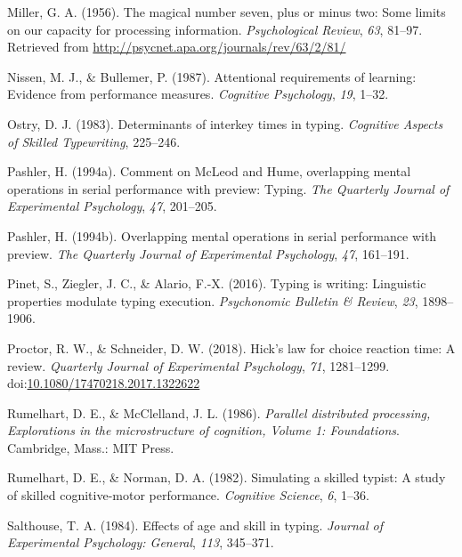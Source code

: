 \documentclass[,man,floatsintext]{apa6}
\begin{document}
\leavevmode\hypertarget{ref-miller_magical_1956}{}%
Miller, G. A. (1956). The magical number seven, plus or minus two: Some limits on our capacity for processing information. \emph{Psychological Review}, \emph{63}, 81--97. Retrieved from \url{http://psycnet.apa.org/journals/rev/63/2/81/}

\leavevmode\hypertarget{ref-NissenAttentionalrequirementslearning1987}{}%
Nissen, M. J., \& Bullemer, P. (1987). Attentional requirements of learning: Evidence from performance measures. \emph{Cognitive Psychology}, \emph{19}, 1--32.

\leavevmode\hypertarget{ref-OstryDeterminantsinterkeytimes1983}{}%
Ostry, D. J. (1983). Determinants of interkey times in typing. \emph{Cognitive Aspects of Skilled Typewriting}, 225--246.

\leavevmode\hypertarget{ref-pashler_comment_1994}{}%
Pashler, H. (1994a). Comment on McLeod and Hume, overlapping mental operations in serial performance with preview: Typing. \emph{The Quarterly Journal of Experimental Psychology}, \emph{47}, 201--205.

\leavevmode\hypertarget{ref-pashler_overlapping_1994}{}%
Pashler, H. (1994b). Overlapping mental operations in serial performance with preview. \emph{The Quarterly Journal of Experimental Psychology}, \emph{47}, 161--191.

\leavevmode\hypertarget{ref-PinetTypingwritingLinguistic2016}{}%
Pinet, S., Ziegler, J. C., \& Alario, F.-X. (2016). Typing is writing: Linguistic properties modulate typing execution. \emph{Psychonomic Bulletin \& Review}, \emph{23}, 1898--1906.

\leavevmode\hypertarget{ref-proctor_hicks_2018}{}%
Proctor, R. W., \& Schneider, D. W. (2018). Hick's law for choice reaction time: A review. \emph{Quarterly Journal of Experimental Psychology}, \emph{71}, 1281--1299. doi:\href{https://doi.org/10.1080/17470218.2017.1322622}{10.1080/17470218.2017.1322622}

\leavevmode\hypertarget{ref-rumelhart_parallel_1986}{}%
Rumelhart, D. E., \& McClelland, J. L. (1986). \emph{Parallel distributed processing, Explorations in the microstructure of cognition, Volume 1: Foundations}. Cambridge, Mass.: MIT Press.

\leavevmode\hypertarget{ref-RumelhartSimulatingskilledtypist1982}{}%
Rumelhart, D. E., \& Norman, D. A. (1982). Simulating a skilled typist: A study of skilled cognitive-motor performance. \emph{Cognitive Science}, \emph{6}, 1--36.

\leavevmode\hypertarget{ref-salthouse_effects_1984}{}%
Salthouse, T. A. (1984). Effects of age and skill in typing. \emph{Journal of Experimental Psychology: General}, \emph{113}, 345--371.
\end{document}
